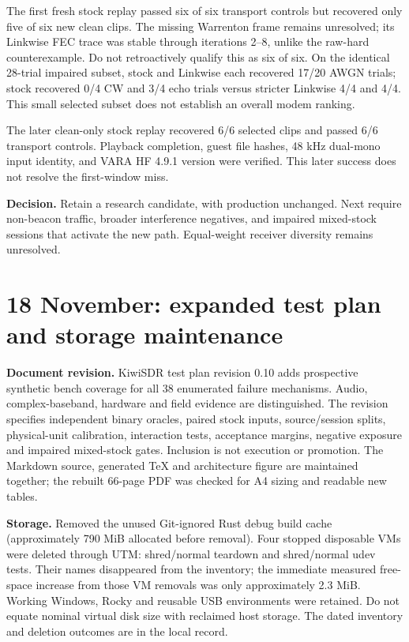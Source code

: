 \documentclass[11pt,a4paper]{article}
\newcommand{\pathtext}[1]{\path{#1}}
\begin{document}
The first fresh stock replay passed six of six transport controls but recovered
only five of six new clean clips. The missing Warrenton frame remains unresolved;
its Linkwise FEC trace was stable through iterations 2--8, unlike the raw-hard
counterexample. Do not retroactively qualify this as six of six. On the identical
28-trial impaired subset, stock and Linkwise each recovered 17/20 AWGN trials;
stock recovered 0/4 CW and 3/4 echo trials versus stricter Linkwise 4/4 and 4/4.
This small selected subset does not establish an overall modem ranking.


The later clean-only stock replay recovered 6/6 selected clips and passed 6/6 transport controls. Playback completion, guest file hashes, 48 kHz dual-mono input identity, and VARA HF 4.9.1 version were verified. This later success does not resolve the first-window miss.

\textbf{Decision.} Retain a research candidate, with production unchanged.
Next require non-beacon traffic, broader interference negatives, and impaired
mixed-stock sessions that activate the new path. Equal-weight receiver diversity
remains unresolved.

\clearpage

\clearpage

\section{18 November: expanded test plan and storage maintenance}
\textbf{Document revision.} KiwiSDR test plan revision 0.10 adds prospective
synthetic bench coverage for all 38 enumerated failure mechanisms. Audio,
complex-baseband, hardware and field evidence are distinguished. The revision
specifies independent binary oracles, paired stock inputs, source/session splits,
physical-unit calibration, interaction tests, acceptance margins, negative
exposure and impaired mixed-stock gates. Inclusion is not execution or promotion.
The Markdown source, generated TeX and architecture figure are maintained together;
the rebuilt 66-page PDF was checked for A4 sizing and readable new tables.

\textbf{Storage.} Removed the unused Git-ignored Rust debug build cache
(approximately 790 MiB allocated before removal). Four stopped disposable VMs
were deleted through UTM: shred/normal teardown and shred/normal udev tests.
Their names disappeared from the inventory; the immediate measured free-space
increase from those VM removals was only approximately 2.3 MiB. Working Windows,
Rocky and reusable USB environments were retained. Do not equate nominal virtual
disk size with reclaimed host storage. The dated inventory and deletion outcomes
are in the local \pathtext{storage-cleanup-2026-11-18.json} record.
\end{document}
